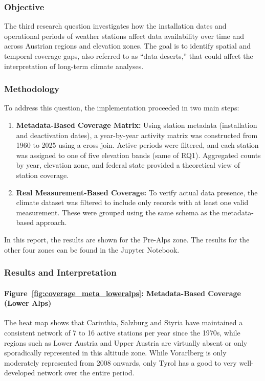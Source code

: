 \subsubsection{Objective}
The third research question investigates how the installation dates and operational periods of weather stations affect data availability over time and across Austrian regions and elevation zones. The goal is to identify spatial and temporal coverage gaps, also referred to as ``data deserts,'' that could affect the interpretation of long-term climate analyses.

\subsubsection{Methodology}

To address this question, the implementation proceeded in two main steps:

\begin{enumerate}
  \item \textbf{Metadata-Based Coverage Matrix:}  
    Using station metadata (installation and deactivation dates), a year-by-year activity matrix was constructed from 1960 to 2025 using a cross join. Active periods were filtered, and each station was assigned to one of five elevation bands (same of RQ1).
    Aggregated counts by year, elevation zone, and federal state provided a theoretical view of station coverage.

  \item \textbf{Real Measurement-Based Coverage:}  
    To verify actual data presence, the climate dataset was filtered to include only records with at least one valid measurement. These were grouped using the same schema as the metadata-based approach.
\end{enumerate}

In this report, the results are shown for the Pre-Alps zone. The results for the other four zones can be found in the Jupyter Notebook.

\subsubsection{Results and Interpretation}

\paragraph{Figure~\ref{fig:coverage_meta_loweralps}: Metadata-Based Coverage (Lower Alps)}  
The heat map shows that Carinthia, Salzburg and Styria have maintained a consistent network of 7 to 16 active stations per year since the 1970s, while regions such as Lower Austria and Upper Austria are virtually absent or only sporadically represented in this altitude zone. While Vorarlberg is only moderately represented from 2008 onwards, only Tyrol has a good to very well-developed network over the entire period.

